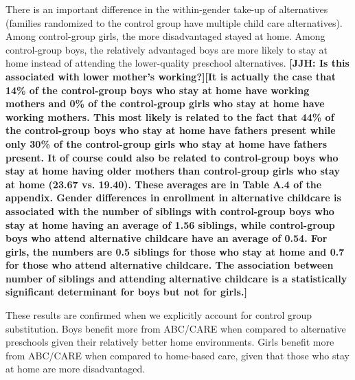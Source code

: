 There is an important difference in the within-gender take-up of alternatives (families randomized to the control group have multiple child care alternatives). Among control-group girls, the more disadvantaged stayed at home. Among control-group boys, the relatively advantaged boys are more likely to stay at home instead of attending the lower-quality preschool alternatives. \textbf{[JJH: Is this associated with lower mother's working?][It is actually the case that 14\% of the control-group boys who stay at home have working mothers and 0\% of the control-group girls who stay at home have working mothers. This most likely is related to the fact that 44\% of the control-group boys who stay at home have fathers present while only 30\% of the control-group girls who stay at home have fathers present. It of course could also be related to control-group boys who stay at home having older mothers than control-group girls who stay at home (23.67 vs. 19.40). These averages are in Table A.4 of the appendix. Gender differences in enrollment in alternative childcare is associated with the number of siblings with control-group boys who stay at home having an average of 1.56 siblings, while control-group boys who attend alternative childcare have an average of 0.54. For girls, the numbers are 0.5 siblings for those who stay at home and 0.7 for those who attend alternative childcare. The association between number of siblings and attending alternative childcare is a statistically significant determinant for boys but not for girls.]}

These results are confirmed when we explicitly account for control group substitution. Boys benefit more from ABC/CARE when compared to alternative preschools given their relatively better home environments. Girls benefit more from ABC/CARE when compared to home-based care, given that those who stay at home are more disadvantaged.


